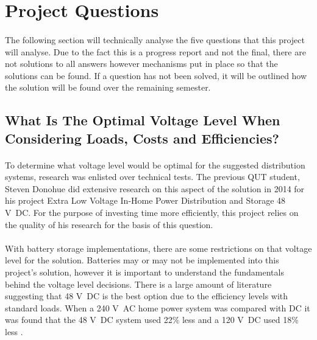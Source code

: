 \section{Project Questions}

\paragraph{}
The following section will technically analyse the five questions that this project will analyse. Due to the fact this is a progress report and not the final, there are not solutions to all answers however mechanisms put in place so that the solutions can be found. If a question has not been solved, it will be outlined how the solution will be found over the remaining semester. 

\subsection{What Is The Optimal Voltage Level When Considering Loads, Costs and Efficiencies?}

\paragraph{}
To determine what voltage level would be optimal for the suggested distribution systems, research was enlisted over technical tests. The previous QUT student, Steven Donohue did extensive research on this aspect of the solution in 2014 for his project Extra Low Voltage In-Home Power Distribution and Storage 48 \si{V DC}. For the purpose of investing time more efficiently, this project relies on the quality of his research for the basis of this question. 

\paragraph{}
With battery storage implementations, there are some restrictions on that voltage level for the solution. Batteries may or may not be implemented into this project's solution, however it is important to understand the fundamentals behind the voltage level decisions. There is a large amount of literature suggesting that 48 \si{V DC} is the best option due to the efficiency levels with standard loads. When a 240 \si{V AC} home power system was compared with DC it was found that the 48 \si{V DC} system used 22\% less and a 120 \si{V DC} used 18\% less \cite{Donohue2014}. 


